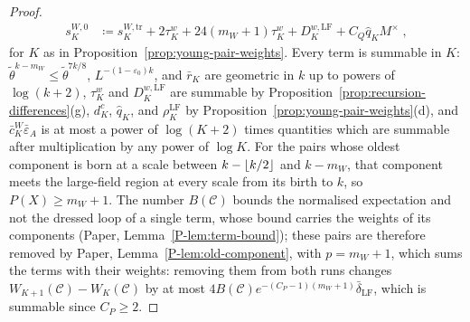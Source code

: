 \documentclass[11pt]{preprint}
\DeclarePairedDelimiter{\floor}{\lfloor}{\rfloor}
\numberwithin{equation}{section}
\theoremstyle{definition}
\theoremstyle{remark}
\theoremstyle{plain}
\begin{document}
\begin{proof}
\begin{equation}
\begin{aligned}
    s^{W,0}_K &\coloneqq s^{W,\mathrm{tr}}_K + 2\tau^w_K + 24(m_W + 1)\tau^w_K + D^{w,\mathrm{LF}}_K + C_Q\hat q_KM^\times\;,
\end{aligned}
\end{equation}
for $K$ as in Proposition~\ref{prop:young-pair-weights}. Every term is summable in $K$: $\tilde\theta^{k-m_W} \leq \tilde\theta^{7k/8}$, $L^{-(1-\varepsilon_0)k}$, and $\bar r_K$ are geometric in $k$ up to powers of $\log(k + 2)$, $\tau^w_K$ and $D^{w,\mathrm{LF}}_K$ are summable by Proposition~\ref{prop:recursion-differences}(g), $d^c_K$, $\hat q_K$, and $\rho^{\mathrm{LF}}_K$ by Proposition~\ref{prop:young-pair-weights}(d), and $\bar c^W_K\bar\varepsilon_A$ is at most a power of $\log(K + 2)$ times quantities which are summable after multiplication by any power of $\log K$. For the pairs whose oldest component is born at a scale between $k - \floor{k/2}$ and $k - m_W$, that component meets the large-field region at every scale from its birth to $k$, so $P(X) \geq m_W + 1$. The number $B(\mathcal C)$ bounds the normalised expectation and not the dressed loop of a single term, whose bound carries the weights of its components (Paper, Lemma~\ref{P-lem:term-bound}); these pairs are therefore removed by Paper, Lemma~\ref{P-lem:old-component}, with $p = m_W + 1$, which sums the terms with their weights: removing them from both runs changes $W_{K+1}(\mathcal C) - W_K(\mathcal C)$ by at most $4B(\mathcal C)e^{-(C_P-1)(m_W+1)}\bar\delta_{\mathrm{LF}}$, which is summable since $C_P \geq 2$.


\end{proof}
\end{document}
